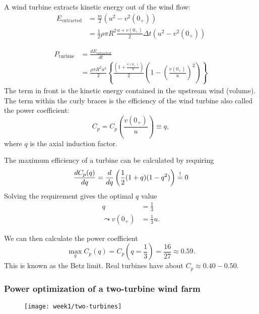 A wind turbine extracts kinetic energy out of the wind flow:
\begin{align}
    E_\mathrm{extracted} &= \frac{m}{2} \left(u^2-v^2(0_+)\right)\\
    &= \frac{1}{2}\rho\pi R^2\frac{u+v(0_+)}{2}\Delta t (u^2-v^2(0_+))
    \label{}
\end{align}

\begin{align}
    P_\mathrm{turbine} &= \frac{d E_\mathrm{extracted}}{dt}\\
    &= \frac{\rho\pi R^2 u^3}{2} \left\{\frac{\left(1+\frac{v(0_+)}{u}\right)}{2}\left(1-\left(\frac{v(0_+)}{u}\right)^2\right)\right\}
    \label{}
\end{align}
The term in front is the kinetic energy contained in the upstream wind (volume). The term within the curly braces is the efficiency of the wind turbine also called the power coefficient:
\begin{equation}
    C_p = C_p\left(\frac{v(0_+)}{u}\right) \equiv q,
    \label{}
\end{equation}
where $q$ is the axial induction factor.

The maximum efficiency of a turbine can be calculated by requiring
\begin{equation}
\frac{d C_p(q)}{d q} = \frac{d }{d q} \left(\frac{1}{2} (1+q)(1-q^2)\right) \overset{!}{=} 0
\label{eq:power-coefficient}
\end{equation}
Solving the requirement gives the optimal $q$ value
\begin{align}
q &= \frac{1}{3}\\
\leadsto
v(0_+) &= \frac{1}{3}u.
\end{align}

We can then calculate the power coefficient
\begin{equation}
\max_q C_p(q) = C_p(q=\frac{1}{3}) = \frac{16}{27} \approx 0.59.
\end{equation}
This is known as the Betz limit. Real turbines have about $C_p \approx 0.40-0.50$.


\subsubsection{Power optimization of a two-turbine wind farm}
\begin{figure}[h!]
    \centering
    \texttt{[image: week1/two-turbines]}
    \caption{}
    \label{fig:two-turbines}
\end{figure}

